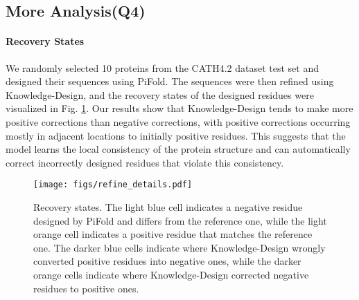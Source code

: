 \documentclass{article}
\begin{document}
\subsection{More Analysis(Q4)}
\vspace{-3mm}
\paragraph{Recovery States} We randomly selected 10 proteins from the CATH4.2 dataset test set and designed their sequences using PiFold. The sequences were then refined using Knowledge-Design, and the recovery states of the designed residues were visualized in Fig. \ref{fig:refine_details}. Our results show that Knowledge-Design tends to make more positive corrections than negative corrections, with positive corrections occurring mostly in adjacent locations to initially positive residues. This suggests that the model learns the local consistency of the protein structure and can automatically correct incorrectly designed residues that violate this consistency.



\vspace{-3mm}
\begin{figure}[h]
   \centering
   \texttt{[image: figs/refine\_details.pdf]}
   \vspace{-3mm}
   \caption{Recovery states. The light blue cell indicates a negative residue designed by PiFold and differs from the reference one, while the light orange cell indicates a positive residue that matches the reference one. The darker blue cells indicate where Knowledge-Design wrongly converted positive residues into negative ones, while the darker orange cells indicate where Knowledge-Design corrected negative residues to positive ones. }
   \label{fig:refine_details}
   \vspace{-3mm}
\end{figure}
\end{document}
